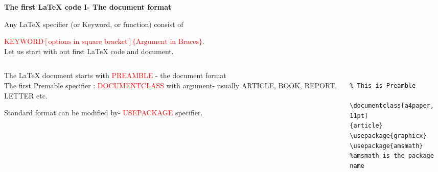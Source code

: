\documentclass[xcolor=dvipsnames]{beamer}
\begin{document}
\begin{frame}[fragile]{\textbf{The first \LaTeX{} code I- The document format}}

 
Any \LaTeX{} specifier (or Keyword, or function) consist of\par
\vspace{0.2cm}
\textcolor{red}{$\textrm{KEYWORD}$$[\textrm{options in square bracket}]$$\{\textrm{Argument in Braces}\}$.}\\
 \vspace{0.2cm}
 Let us start with out first \LaTeX{} code and document.\\
 \vspace{0.4cm}

\begin{columns}
\begin{column}{0.5\textwidth}
The \LaTeX{} document starts with \textcolor{red}{PREAMBLE} - the document format\\

 \vspace{0.2cm}
The first Premable specifier : \textcolor{red}{DOCUMENTCLASS} with argument- usually ARTICLE, BOOK, REPORT, LETTER etc.\\

 \vspace{0.2cm}

Standard format can be modified by- \textcolor{red}{USEPACKAGE} specifier.\\

\end{column}
\hfill
\begin{column}{0.57\textwidth}
\small
\begin{Verbatim}[frame=single]

% This is Preamble

\documentclass[a4paper, 11pt]
{article}
\usepackage{graphicx}
\usepackage{amsmath}
%amsmath is the package name


\end{Verbatim}
\end{column}
\end{columns}



\end{frame}
\end{document}
